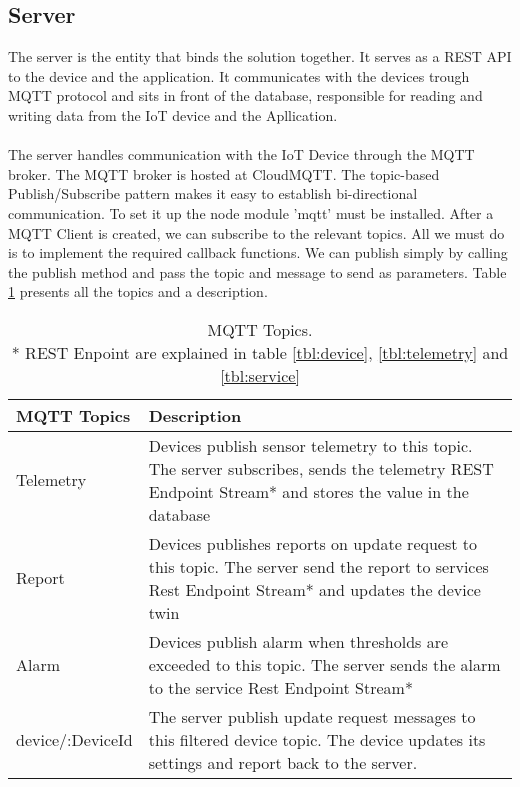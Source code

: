 \subsection{Server}
The server is the entity that binds the solution together. It serves as a REST API to the device and the application. It communicates with the devices trough MQTT protocol and sits in front of the database, responsible for reading and writing data from the IoT device and the Apllication. \\\\ The server handles communication with the IoT Device through the MQTT broker. The MQTT broker is hosted at CloudMQTT. The topic-based Publish/Subscribe pattern makes it easy to establish bi-directional communication. To set it up the node module 'mqtt' must be installed. After a MQTT Client is created, we can subscribe to the relevant topics. All we must do is to implement the required callback functions. We can publish simply by calling the publish method and pass the topic and message to send as parameters. Table \ref{tbl:topics} presents all the topics and a description.

\begin{table}[H]
    \centering
    \begin{tabular}{|l|p{10cm}|}
    \hline
    \textbf{MQTT Topics}    & \textbf{Description} \\ \hline
    Telemetry & Devices publish sensor telemetry to this topic. The server subscribes, sends the telemetry REST Endpoint Stream* and stores the value in the database \\ \hline
    Report & Devices publishes reports on update request to this topic. The server send the report to services Rest Endpoint Stream* and updates the device twin \\ \hline
    Alarm & Devices publish alarm when thresholds are exceeded to this topic. The server sends the alarm to the service Rest Endpoint Stream* \\ \hline
    device/:DeviceId & The server publish update request messages to this filtered device topic. The device updates its settings and report back to the server. \\ \hline
    \end{tabular}
    \caption{MQTT Topics.\\ * REST Enpoint are explained in table \ref{tbl:device}, \ref{tbl:telemetry} and \ref{tbl:service}}
    \label{tbl:topics}
\end{table}

